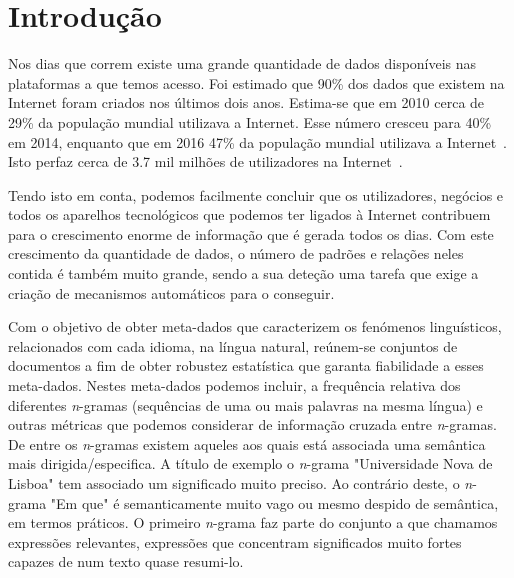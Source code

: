 \newcommand{\novathesis}{\emph{novathesis}}
\newcommand{\novathesisclass}{\texttt{novathesis.cls}}

\chapter{Introdução}
\label{cha:introduction}
Nos dias que correm existe uma grande quantidade de dados disponíveis nas plataformas a que temos acesso. Foi estimado que  90\% dos dados que existem na Internet foram criados nos últimos dois anos. Estima-se que em 2010 cerca de 29\% da população mundial utilizava a Internet. Esse número cresceu para 40\% em 2014, enquanto que em 2016 47\% da população mundial utilizava a Internet~\cite{ICTFigures02}. Isto perfaz cerca de 3.7 mil milhões de utilizadores na Internet~\cite{ICTFigures01}.

Tendo isto em conta, podemos facilmente concluir que os utilizadores, negócios e todos os aparelhos tecnológicos que podemos ter ligados à Internet contribuem para o crescimento enorme de informação que é gerada todos os dias. Com este crescimento da quantidade de dados, o número de padrões e relações neles contida é também muito grande, sendo a sua deteção uma tarefa que exige a criação de mecanismos automáticos para o conseguir.

Com o objetivo de obter meta-dados que caracterizem os fenómenos linguísticos, relacionados com cada idioma, na língua natural, reúnem-se conjuntos de documentos a fim de obter robustez estatística que garanta fiabilidade a esses meta-dados. Nestes meta-dados podemos incluir, a frequência relativa dos diferentes \textit{n}-gramas (sequências de uma ou mais palavras na mesma língua) e outras métricas que podemos considerar de informação cruzada entre \textit{n}-gramas. De entre os \textit{n}-gramas existem aqueles aos quais está associada uma semântica mais dirigida/especifica. A título de exemplo o \textit{n}-grama "Universidade Nova de Lisboa" \thinspace tem associado um significado muito preciso. Ao contrário deste, o \textit{n}-grama "Em que" \thinspace é semanticamente muito vago ou mesmo despido de semântica, em termos práticos. O primeiro \textit{n}-grama faz parte do conjunto a que chamamos expressões relevantes, expressões que concentram significados muito fortes capazes de num texto quase resumi-lo.

